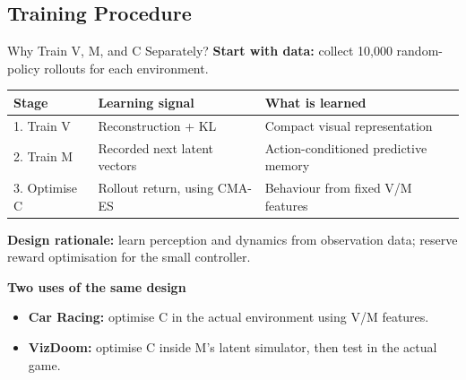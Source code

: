 \documentclass[xcolor=dvipsnames,aspectratio=169]{beamer}
\begin{document}
\subsection{Training Procedure}
\begin{frame}{Why Train V, M, and C Separately?}
    \small
    \textbf{Start with data:} collect 10,000 random-policy rollouts for each environment.

    \medskip
    \begin{tabularx}{\linewidth}{@{}l X X@{}}
        \toprule
        Stage & Learning signal & What is learned \\
        \midrule
        1. Train V & Reconstruction + KL & Compact visual representation \\
        2. Train M & Recorded next latent vectors & Action-conditioned predictive memory \\
        3. Optimise C & Rollout return, using CMA-ES & Behaviour from fixed V/M features \\
        \bottomrule
    \end{tabularx}

    \medskip
    \textbf{Design rationale:} learn perception and dynamics from observation data;
    reserve reward optimisation for the small controller.

    \medskip
    \textbf{Two uses of the same design}
    \begin{itemize}
        \item \textbf{Car Racing:} optimise C in the actual environment using V/M features.
        \item \textbf{VizDoom:} optimise C inside M's latent simulator, then test in the actual game.
    \end{itemize}
\end{frame}
\end{document}
